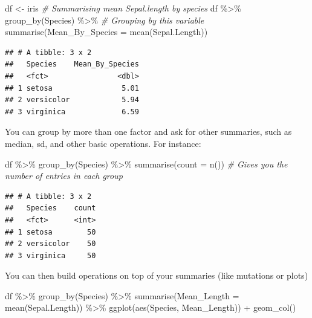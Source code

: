\documentclass[
]{book}
\newenvironment{Shaded}{\begin{snugshade}}{\end{snugshade}}
\newcommand{\AttributeTok}[1]{\textcolor[rgb]{0.77,0.63,0.00}{#1}}
\newcommand{\CommentTok}[1]{\textcolor[rgb]{0.56,0.35,0.01}{\textit{#1}}}
\newcommand{\FunctionTok}[1]{\textcolor[rgb]{0.00,0.00,0.00}{#1}}
\newcommand{\NormalTok}[1]{#1}
\newcommand{\OtherTok}[1]{\textcolor[rgb]{0.56,0.35,0.01}{#1}}
\newcommand{\SpecialCharTok}[1]{\textcolor[rgb]{0.00,0.00,0.00}{#1}}
\begin{document}
\begin{Shaded}
\begin{Highlighting}[]
\NormalTok{df }\OtherTok{\textless{}{-}}\NormalTok{ iris}
\CommentTok{\# Summarising mean Sepal.length by species}
\NormalTok{df }\SpecialCharTok{\%\textgreater{}\%} 
  \FunctionTok{group\_by}\NormalTok{(Species) }\SpecialCharTok{\%\textgreater{}\%}  \CommentTok{\# Grouping by this variable}
  \FunctionTok{summarise}\NormalTok{(}\AttributeTok{Mean\_By\_Species =} \FunctionTok{mean}\NormalTok{(Sepal.Length)) }
\end{Highlighting}
\end{Shaded}

\begin{verbatim}
## # A tibble: 3 x 2
##   Species    Mean_By_Species
##   <fct>                <dbl>
## 1 setosa                5.01
## 2 versicolor            5.94
## 3 virginica             6.59
\end{verbatim}

You can group by more than one factor and ask for other summaries, such as median, sd, and other basic operations.
For instance:

\begin{Shaded}
\begin{Highlighting}[]
\NormalTok{df }\SpecialCharTok{\%\textgreater{}\%} 
  \FunctionTok{group\_by}\NormalTok{(Species) }\SpecialCharTok{\%\textgreater{}\%} 
  \FunctionTok{summarise}\NormalTok{(}\AttributeTok{count =} \FunctionTok{n}\NormalTok{())  }\CommentTok{\# Gives you the number of entries in each group}
\end{Highlighting}
\end{Shaded}

\begin{verbatim}
## # A tibble: 3 x 2
##   Species    count
##   <fct>      <int>
## 1 setosa        50
## 2 versicolor    50
## 3 virginica     50
\end{verbatim}

You can then build operations on top of your summaries (like mutations or plots)

\begin{Shaded}
\begin{Highlighting}[]
\NormalTok{df }\SpecialCharTok{\%\textgreater{}\%} 
  \FunctionTok{group\_by}\NormalTok{(Species) }\SpecialCharTok{\%\textgreater{}\%} 
  \FunctionTok{summarise}\NormalTok{(}\AttributeTok{Mean\_Length =} \FunctionTok{mean}\NormalTok{(Sepal.Length)) }\SpecialCharTok{\%\textgreater{}\%} 
  \FunctionTok{ggplot}\NormalTok{(}\FunctionTok{aes}\NormalTok{(Species, Mean\_Length)) }\SpecialCharTok{+} 
  \FunctionTok{geom\_col}\NormalTok{()}
\end{Highlighting}
\end{Shaded}
\end{document}

